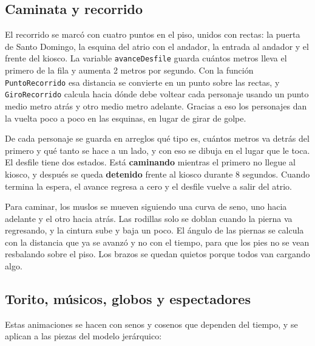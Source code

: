 \documentclass[11pt,a4paper]{article}
\begin{document}
\subsection{Caminata y recorrido}

El recorrido se marcó con cuatro puntos en el piso, unidos con rectas: la puerta de Santo Domingo, la esquina del atrio con el andador, la entrada al andador y el frente del kiosco. La variable \texttt{avanceDesfile} guarda cuántos metros lleva el primero de la fila y aumenta 2 metros por segundo. Con la función \texttt{PuntoRecorrido} esa distancia se convierte en un punto sobre las rectas, y \texttt{GiroRecorrido} calcula hacia dónde debe voltear cada personaje usando un punto medio metro atrás y otro medio metro adelante. Gracias a eso los personajes dan la vuelta poco a poco en las esquinas, en lugar de girar de golpe.

De cada personaje se guarda en arreglos qué tipo es, cuántos metros va detrás del primero y qué tanto se hace a un lado, y con eso se dibuja en el lugar que le toca. El desfile tiene dos estados. Está \textbf{caminando} mientras el primero no llegue al kiosco, y después se queda \textbf{detenido} frente al kiosco durante 8 segundos. Cuando termina la espera, el avance regresa a cero y el desfile vuelve a salir del atrio.

Para caminar, los muslos se mueven siguiendo una curva de seno, uno hacia adelante y el otro hacia atrás. Las rodillas solo se doblan cuando la pierna va regresando, y la cintura sube y baja un poco. El ángulo de las piernas se calcula con la distancia que ya se avanzó y no con el tiempo, para que los pies no se vean resbalando sobre el piso. Los brazos se quedan quietos porque todos van cargando algo.

\subsection{Torito, músicos, globos y espectadores}

Estas animaciones se hacen con senos y cosenos que dependen del tiempo, y se aplican a las piezas del modelo jerárquico:
\end{document}
